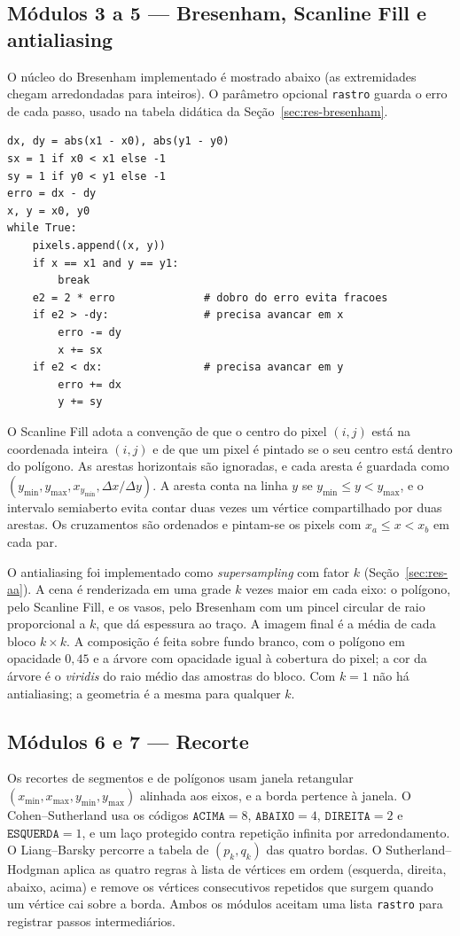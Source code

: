 \documentclass[11pt, a4paper]{article}
\begin{document}
\subsection{Módulos 3 a 5 --- Bresenham, Scanline Fill e antialiasing}
O núcleo do Bresenham implementado é mostrado abaixo (as extremidades chegam arredondadas para inteiros). O parâmetro opcional \texttt{rastro} guarda o erro de cada passo, usado na tabela didática da Seção~\ref{sec:res-bresenham}.
\begin{lstlisting}
dx, dy = abs(x1 - x0), abs(y1 - y0)
sx = 1 if x0 < x1 else -1
sy = 1 if y0 < y1 else -1
erro = dx - dy
x, y = x0, y0
while True:
    pixels.append((x, y))
    if x == x1 and y == y1:
        break
    e2 = 2 * erro              # dobro do erro evita fracoes
    if e2 > -dy:               # precisa avancar em x
        erro -= dy
        x += sx
    if e2 < dx:                # precisa avancar em y
        erro += dx
        y += sy
\end{lstlisting}

O Scanline Fill adota a convenção de que o centro do pixel $(i,j)$ está na coordenada inteira $(i,j)$ e de que um pixel é pintado se o seu centro está dentro do polígono. As arestas horizontais são ignoradas, e cada aresta é guardada como $(y_{\min},y_{\max},x_{y_{\min}},\Delta x/\Delta y)$. A aresta conta na linha $y$ se $y_{\min}\le y<y_{\max}$, e o intervalo semiaberto evita contar duas vezes um vértice compartilhado por duas arestas. Os cruzamentos são ordenados e pintam-se os pixels com $x_a\le x<x_b$ em cada par.

O antialiasing foi implementado como \emph{supersampling} com fator $k$ (Seção~\ref{sec:res-aa}). A cena é renderizada em uma grade $k$ vezes maior em cada eixo: o polígono, pelo Scanline Fill, e os vasos, pelo Bresenham com um pincel circular de raio proporcional a $k$, que dá espessura ao traço. A imagem final é a média de cada bloco $k\times k$. A composição é feita sobre fundo branco, com o polígono em opacidade $0{,}45$ e a árvore com opacidade igual à cobertura do pixel; a cor da árvore é o \emph{viridis} do raio médio das amostras do bloco. Com $k=1$ não há antialiasing; a geometria é a mesma para qualquer $k$.

\subsection{Módulos 6 e 7 --- Recorte}
Os recortes de segmentos e de polígonos usam janela retangular $(x_{\min},x_{\max},y_{\min},y_{\max})$ alinhada aos eixos, e a borda pertence à janela. O Cohen--Sutherland usa os códigos $\texttt{ACIMA}=8$, $\texttt{ABAIXO}=4$, $\texttt{DIREITA}=2$ e $\texttt{ESQUERDA}=1$, e um laço protegido contra repetição infinita por arredondamento. O Liang--Barsky percorre a tabela de $(p_k,q_k)$ das quatro bordas. O Sutherland--Hodgman aplica as quatro regras à lista de vértices em ordem (esquerda, direita, abaixo, acima) e remove os vértices consecutivos repetidos que surgem quando um vértice cai sobre a borda. Ambos os módulos aceitam uma lista \texttt{rastro} para registrar passos intermediários.
\end{document}
